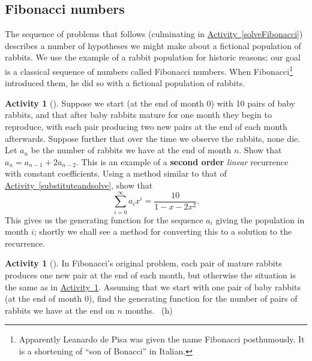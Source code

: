 \documentclass[10pt,]{book}
\newcommand{\terminology}[1]{\textbf{#1}}
\theoremstyle{plain}
\theoremstyle{definition}
\theoremstyle{definition}
\theoremstyle{definition}
\newtheorem{activity}[project]{Activity}
\numberwithin{equation}{chapter}
\begin{document}
\subsection[{Fibonacci numbers}]{Fibonacci numbers}\label{subsection-37}
\hypertarget{p-1344}{}%
The sequence of problems that follows (culminating in \hyperref[solveFibonacci]{Activity~\ref{solveFibonacci}}) describes a number of hypotheses we might make about a fictional population of rabbits. We use the example of a rabbit population for historic reasons; our goal is a classical sequence of numbers called Fibonacci numbers. When Fibonacci\footnote{Apparently Leanardo de Pisa was given the name Fibonacci posthumously. It is a shortening of ``son of Bonacci'' in Italian.\label{fn-17}} introduced them, he did so with a fictional population of rabbits.%
\begin{activity}[]\label{secondorderintroduction}
\hypertarget{p-1345}{}%
Suppose we start (at the end of month 0) with 10 pairs of baby rabbits, and that after baby rabbits mature for one month they begin to reproduce, with each pair producing two new pairs at the end of each month afterwards. Suppose further that over the time we observe the rabbits, none die. Let \(a_n\) be the number of rabbits we have at the end of month \(n\). Show that \(a_n=a_{n-1} + 2a_{n-2}\). This is an example of a \terminology{second order} \emph{linear} recurrence with constant coefficients. Using a method similar to that of \hyperref[substituteandsolve]{Activity~\ref{substituteandsolve}}, show that%
\begin{equation*}
\sum_{i=0}^\infty a_ix^i = \frac{10}{1-x-2x^2}.
\end{equation*}
This gives us the generating function for the sequence \(a_i\) giving the population in month \(i\); shortly we shall see a method for converting this to a solution to the recurrence.%
\end{activity}
\begin{activity}[]\label{originalFibonacci}
\hypertarget{p-1347}{}%
In Fibonacci's original problem, each pair of mature rabbits produces one new pair at the end of each month, but otherwise the situation is the same as in \hyperref[secondorderintroduction]{Activity~\ref{secondorderintroduction}}.  Assuming that we start with one pair of baby rabbits (at the end of month 0), find the generating function for the number of pairs of rabbits we have at the end on \(n\) months.%
~{\tiny (h)}\end{activity}
\end{document}
